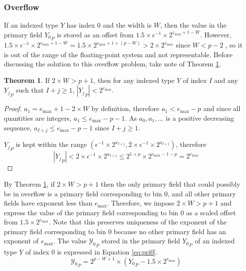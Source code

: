 \documentclass[12pt]{article}
\providecommand{\max}{\ensuremath{\text{max}}}
\theoremstyle{definition}
\newtheorem{thm}{Theorem}[section]
\numberwithin{equation}{section}
\begin{document}
    \subsubsection{Overflow}
      \label{sec:indexed_implementation_overflow}
      If an indexed type $Y$ has index 0 and the width is $W$, then the value in the primary field ${Y_0}_P$ is stored as an offset from $1.5\times\epsilon^{-1}\times2^{e_{\max} + 1 - W}$. However, $1.5\times\epsilon^{-1}\times2^{e_{\max} + 1 - W} = 1.5 \times 2^{e_{\max} + 1 + (p - W)} > 2 \times 2^{e_{\max}}$ since $W < p - 2$ \cite{repsum}, so it is out of the range of the floating-point system and not representable. Before discussing the solution to this overflow problem, take note of Theorem \ref{thm:overflow}.
      \begin{thm}
        If $2\times W > p + 1$, then for any indexed type $Y$ of index $I$ and any ${Y_j}_P$ such that $I + j \geq 1$, $|{Y_j}_P| < 2^{e_{\max}}$.
        \label{thm:overflow}
      \end{thm}
      \begin{proof}
        $a_1 = e_{\max} + 1 - 2\times W$ by definition, therefore $a_1 < e_{\max} - p$ and since all quantities are integers, $a_1 \leq e_{\max} - p - 1$. As $a_0, a_1, ...$ is a positive decreasing sequence, $a_{I + j} \leq e_{\max} - p - 1$ since $I + j \geq 1$.

        ${Y_j}_P$ is kept within the range $(\epsilon^{-1} \times 2^{a_{I + j}}, 2 \times \epsilon^{-1} \times 2^{a_{I + j}})$, therefore
        \begin{equation*}
          |{Y_j}_P| < 2 \times \epsilon^{-1} \times 2^{a_{I + j}} \leq 2^{1 + p} \times 2^{e_{\max} - 1 - p} = 2^{e_{\max}}
        \end{equation*}
      \end{proof}
      By Theorem \ref{thm:overflow}, if $2\times W > p + 1$ then the only primary field that could possibly be in overflow is a primary field corresponding to bin 0, and all other primary fields have exponent less than $e_{\max}$. Therefore, we impose $2\times W > p + 1$ and express the value of the primary field corresponding to bin 0 as a scaled offset from $1.5\times2^{e_{\max}}$. Note that this preserves uniqueness of the exponent of the primary field corresponding to bin 0 because no other primary field has an exponent of $e_{\max}$. The value ${\mathcal{Y}_0}_P$ stored in the primary field ${Y_0}_P$ of an indexed type $Y$ of index 0 is expressed in Equation \ref{eq:pri0}.
      \begin{equation}
        {\mathcal{Y}_0}_P = 2^{p - W + 1}\times({Y_0}_P - 1.5\times2^{e_{\max}})
        \label{eq:pri0}
      \end{equation}
\end{document}
